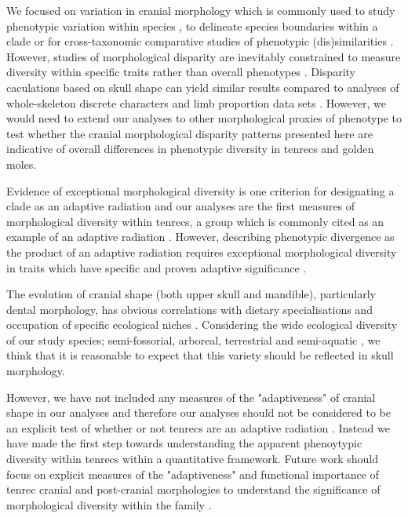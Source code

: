 \documentclass[12pt,a4paper]{article}
\begin{document}

	We focused on variation in cranial morphology which is commonly used to study phenotypic variation within species \citep{Blagojevic2011, Bornholdt2008}, to delineate species boundaries within a clade \citep[e.g.][]{Panchetti2008} or for cross-taxonomic comparative studies of phenotypic (dis)similarities \citep[e.g.][]{Ruta2013, Goswami2011, Wroe2007}.
	However, studies of morphological disparity are inevitably constrained to measure diversity within specific traits rather than overall phenotypes \citep{Roy1997}. Disparity caculations based on skull shape can yield similar results compared to analyses of whole-skeleton discrete characters and limb proportion data sets \citep{Foth2012}. However, we would need to extend our analyses to other morphological proxies of phenotype to test whether the cranial morphological disparity patterns presented here are indicative of overall differences in phenotypic diversity in tenrecs and golden moles. 

 	Evidence of exceptional morphological diversity is one criterion for designating a clade as an adaptive radiation \citep{Losos2010a} and our analyses are the first measures of morphological diversity within tenrecs, a group which is commonly cited as an example of an adaptive radiation \citep{Olson2013}.  However, describing phenotypic divergence as the product of an adaptive radiation requires exceptional morphological diversity in traits which have specific and proven adaptive significance \citep{Losos2010a}. 
 	
 	The evolution of cranial shape (both upper skull and mandible), particularly dental morphology, has obvious correlations with dietary specialisations and occupation of specific ecological niches \citep[e.g.][]{Wroe2007}. Considering the wide ecological diversity of our study species; semi-fossorial, arboreal, terrestrial and semi-aquatic \citep{Soarimalala2011}, we think that it is reasonable to expect that this variety should be reflected in skull morphology.
 	
 	However, we have not included any measures of the "adaptiveness" of cranial shape in our analyses and therefore our analyses should not be considered to be an explicit test of whether or not tenrecs are an adaptive radiation \citep{Losos2010a}. Instead we have made the first step towards understanding the apparent phenoytypic diversity within tenrecs within a quantitative framework. Future work should focus on explicit measures of the "adaptiveness" and functional importance of tenrec cranial and post-cranial morphologies to understand the significance of morphological diversity within the family \citep[e.g.][]{Mahler2010}.
 	
\end{document}
